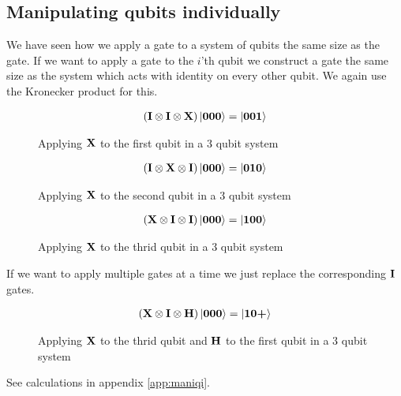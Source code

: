 \subsection{Manipulating qubits individually}\label{sec:maniqi}
We have seen how we apply a gate to a system of qubits the same size as the gate. 
If we want to apply a gate to the $i$'th qubit we construct a gate the same size as the system 
which acts with identity on every other qubit. We again use the Kronecker product for this. 

\begin{figure}[H]
    \centering
    \begin{align*}
        \left(\mathbf{I}\otimes\mathbf{I}\otimes\mathbf{X}\right)\ket{\mathbf{0}\mathbf{0}\mathbf{0}}=\ket{\mathbf{0}\mathbf{0}\mathbf{1}}
    \end{align*}
    \caption{Applying $\mathbf{X}$ to the first qubit in a 3 qubit system}
    \label{fig:individual_application1}
\end{figure}


\begin{figure}[H]
    \centering
    \begin{align*}
        \left(\mathbf{I}\otimes\mathbf{X}\otimes\mathbf{I}\right)\ket{\mathbf{0}\mathbf{0}\mathbf{0}}=\ket{\mathbf{0}\mathbf{1}\mathbf{0}}
    \end{align*}
    \caption{Applying $\mathbf{X}$ to the second qubit in a 3 qubit system}
    \label{fig:individual_application2}
\end{figure}
\begin{figure}[H]
    \centering
    \begin{align*}
        \left(\mathbf{X}\otimes\mathbf{I}\otimes\mathbf{I}\right)\ket{\mathbf{0}\mathbf{0}\mathbf{0}}=\ket{\mathbf{1}\mathbf{0}\mathbf{0}}
    \end{align*}
    \caption{Applying $\mathbf{X}$ to the thrid qubit in a 3 qubit system}
    \label{fig:individual_application3}
\end{figure}
\noindent
If we want to apply multiple gates at a time we just replace the corresponding $\mathbf{I}$ gates. 
\begin{figure}[H]
    \centering
    \begin{align*}
        \left(\mathbf{X}\otimes\mathbf{I}\otimes\mathbf{H}\right)\ket{\mathbf{0}\mathbf{0}\mathbf{0}}=\ket{\mathbf{1}\mathbf{0}\textbf{+}}
    \end{align*}
    \caption{Applying $\mathbf{X}$ to the thrid qubit and $\mathbf{H}$ to the first qubit in a 3 qubit system}
    \label{fig:applying_multiple_gates}
\end{figure}
\noindent
See calculations in appendix \ref{app:maniqi}.

